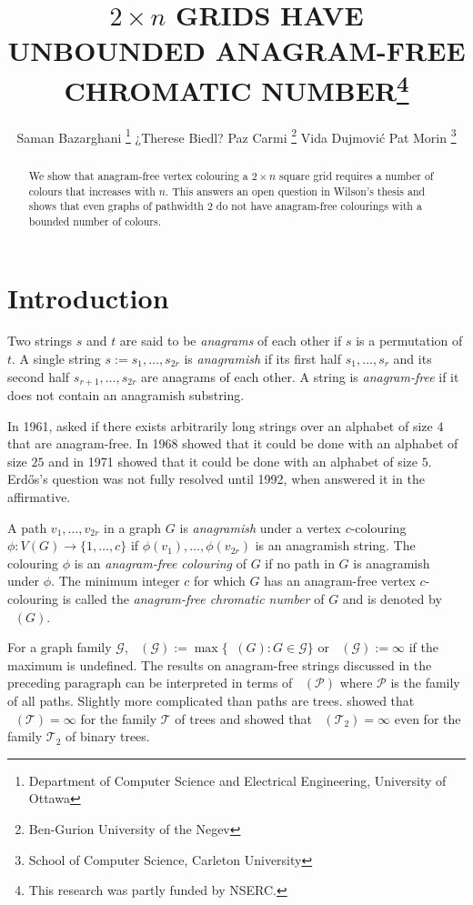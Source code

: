 \documentclass{patmorin}
\title{\MakeUppercase{$2\times n$ Grids have Unbounded Anagram-Free Chromatic Number}\thanks{This research was partly funded by NSERC.}}
\author{Saman Bazarghani%
    \thanks{Department of Computer Science and Electrical Engineering, University of Ottawa}\qquad
    ¿Therese Biedl?%
    \qquad
    Paz Carmi%
    \thanks{Ben-Gurion University of the Negev}\qquad
    Vida Dujmović\footnotemark[2]\qquad
    Pat Morin%
    \thanks{School of Computer Science, Carleton University}}
\DeclareMathOperator{\afcn}{\dot{\chi}_\pi}
\begin{document}
\maketitle

\begin{abstract}
    We show that anagram-free vertex colouring a $2\times n$ square grid requires a number of colours that increases with $n$.  This answers an open question in Wilson's thesis and shows that even graphs of pathwidth 2 do not have anagram-free colourings with a bounded number of colours.
\end{abstract}

%



\section{Introduction}

Two strings $s$ and $t$ are said to be \emph{anagrams} of each other if $s$ is a permutation of $t$.  A single string $s:=s_1,\ldots,s_{2r}$ is \emph{anagramish} if its first half $s_1,\ldots,s_r$ and its second half $s_{r+1},\ldots,s_{2r}$ are anagrams of each other.  A string is \emph{anagram-free} if it does not contain an anagramish substring.

In 1961, \citet{erdos:some} asked if there exists arbitrarily long strings over an alphabet of size $4$ that are anagram-free.  In 1968 \citet{evdokimov:strongly,evdokimov:strongly2} showed that it could be done with an alphabet of size $25$ and in 1971 \citet{pleasants:non-repetitive} showed that it could be done with an alphabet of size $5$.  Erd\H{o}s's question was not fully resolved until 1992, when \citet{keranen:abelian} answered it in the affirmative.

A path $v_1,\ldots,v_{2r}$ in a graph $G$ is \emph{anagramish} under a vertex $c$-colouring $\phi:V(G)\to\{1,\ldots,c\}$ if $\phi(v_1),\ldots,\phi(v_{2r})$ is an anagramish string.  The colouring $\phi$ is an \emph{anagram-free colouring} of $G$ if no path in $G$ is anagramish under $\phi$.  The minimum integer $c$ for which $G$ has an anagram-free vertex $c$-colouring is called the \emph{anagram-free chromatic number} of $G$ and is denoted by $\afcn(G)$.

For a graph family $\mathcal{G}$, $\afcn(\mathcal{G}):=\max\{\afcn(G):G\in\mathcal{G}\}$ or $\afcn(\mathcal{G}):=\infty$ if the maximum is undefined. The results on anagram-free strings discussed in the preceding paragraph can be interpreted in terms of $\afcn(\mathcal{P})$ where $\mathcal{P}$ is the family of all paths.  Slightly more complicated than paths are trees.  \citet{wilson.wood:anagram-free} showed that $\afcn(\mathcal{T})=\infty$ for the family $\mathcal{T}$ of trees and \citet{kamcev.luczak.ea:anagram-free} showed that $\afcn(\mathcal{T_2})=\infty$ even for the family $\mathcal{T}_2$ of binary trees.
\end{document}
